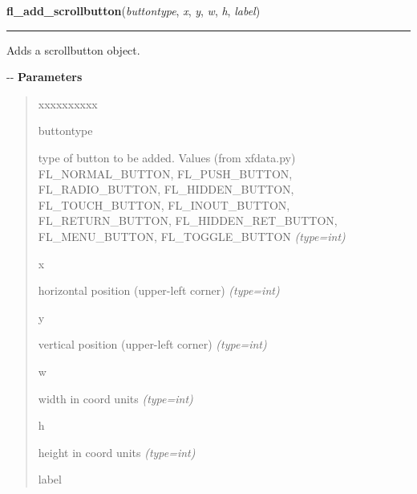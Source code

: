     \label{xformslib:flbutton:fl_add_scrollbutton}

    \vspace{0.5ex}

\hspace{.8\funcindent}\begin{boxedminipage}{\funcwidth}

    \raggedright \textbf{fl\_add\_scrollbutton}(\textit{buttontype}, \textit{x}, \textit{y}, \textit{w}, \textit{h}, \textit{label})

    \vspace{-1.5ex}

    \rule{\textwidth}{0.5\fboxrule}
\setlength{\parskip}{2ex}

Adds a scrollbutton object.

-{}-
\setlength{\parskip}{1ex}
      \textbf{Parameters}
      \vspace{-1ex}

      \begin{quote}
        \begin{Ventry}{xxxxxxxxxx}

          \item[buttontype]


type of button to be added. Values (from xfdata.py) FL\_NORMAL\_BUTTON,
FL\_PUSH\_BUTTON, FL\_RADIO\_BUTTON, FL\_HIDDEN\_BUTTON, FL\_TOUCH\_BUTTON,
FL\_INOUT\_BUTTON, FL\_RETURN\_BUTTON, FL\_HIDDEN\_RET\_BUTTON,
FL\_MENU\_BUTTON, FL\_TOGGLE\_BUTTON
            {\it (type=int)}

          \item[x]


horizontal position (upper-left corner)
            {\it (type=int)}

          \item[y]


vertical position (upper-left corner)
            {\it (type=int)}

          \item[w]


width in coord units
            {\it (type=int)}

          \item[h]


height in coord units
            {\it (type=int)}

          \item[label]



\end{Ventry}
\end{quote}
\end{boxedminipage}
